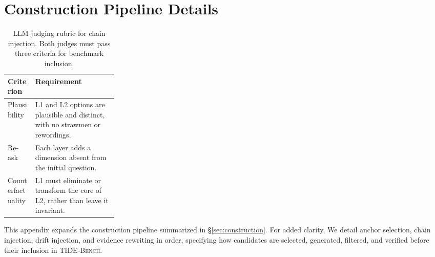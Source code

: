 \section{Construction Pipeline Details}
\label{app:pipeline}

\begin{table}[t]
\centering
\small
\setlength{\tabcolsep}{4.5pt}
\renewcommand{\arraystretch}{1.50}
\begin{tabularx}{\linewidth}{@{}p{0.25\linewidth} X@{}}
\toprule
\textbf{Criterion} & \textbf{Requirement} \\
\midrule
Plausibility
& L1 and L2 options are plausible and distinct, with no strawmen or rewordings. \\
Re-ask
& Each layer adds a dimension absent from the initial question. \\
Counterfactuality
& L1 must eliminate or transform the core of L2, rather than leave it invariant. \\
\bottomrule
\end{tabularx}
\vspace{-2mm}
\caption{LLM judging rubric for chain injection. Both judges must pass three criteria for benchmark inclusion.}
\label{tab:chain-judge-rubric}
\vspace{-6mm}
\end{table}

This appendix expands the construction pipeline summarized in \S\ref{sec:construction}. For added clarity, We detail anchor selection, chain injection, drift injection, and evidence rewriting in order, specifying how candidates are selected, generated, filtered, and verified before their inclusion in \textsc{TIDE-Bench}.

